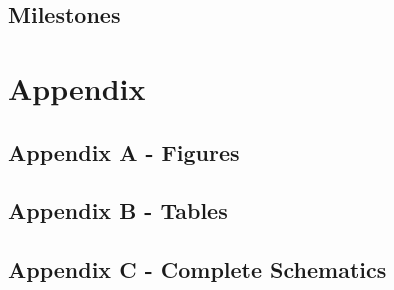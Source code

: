  \subsection{Milestones}
\lipsum[1]
\section{Appendix}
\lipsum[1]
 \subsection{Appendix A - Figures}
\lipsum[1]
 \subsection{Appendix B - Tables}
\lipsum[1]
 \subsection{Appendix C - Complete Schematics}
\lipsum[1]
